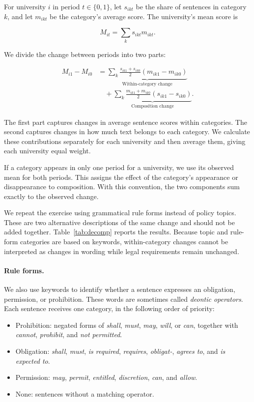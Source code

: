 \documentclass[11pt]{article}
\begin{document}
For university $i$ in period $t\in\{0,1\}$, let $s_{ikt}$ be the share of sentences in category $k$, and let $m_{ikt}$ be the category's average score. The university's mean score is

\begin{equation}
M_{it}=\sum_k s_{ikt}m_{ikt}.
\end{equation}

We divide the change between periods into two parts:

\begin{equation}
\begin{split}
M_{i1}-M_{i0}
&=\underbrace{\sum_k\frac{s_{ik1}+s_{ik0}}{2}(m_{ik1}-m_{ik0})}_{\text{Within-category change}}\\
&\quad+\underbrace{\sum_k\frac{m_{ik1}+m_{ik0}}{2}(s_{ik1}-s_{ik0})}_{\text{Composition change}}.
\end{split}
\end{equation}

The first part captures changes in average sentence scores within categories. The second captures changes in how much text belongs to each category. We calculate these contributions separately for each university and then average them, giving each university equal weight.

If a category appears in only one period for a university, we use its observed mean for both periods. This assigns the effect of the category's appearance or disappearance to composition. With this convention, the two components sum exactly to the observed change.

We repeat the exercise using grammatical rule forms instead of policy topics. These are two alternative descriptions of the same change and should not be added together. Table~\ref{tab:decomp} reports the results. Because topic and rule-form categories are based on keywords, within-category changes cannot be interpreted as changes in wording while legal requirements remain unchanged.



\paragraph{Rule forms.}
We also use keywords to identify whether a sentence expresses an obligation, permission, or prohibition. These words are sometimes called \emph{deontic operators}. Each sentence receives one category, in the following order of priority:

\begin{itemize}
\item Prohibition: negated forms of \emph{shall}, \emph{must}, \emph{may}, \emph{will}, or \emph{can}, together with \emph{cannot}, \emph{prohibit}, and \emph{not permitted}.
\item Obligation: \emph{shall}, \emph{must}, \emph{is required}, \emph{requires}, \emph{obligat-}, \emph{agrees to}, and \emph{is expected to}.
\item Permission: \emph{may}, \emph{permit}, \emph{entitled}, \emph{discretion}, \emph{can}, and \emph{allow}.
\item None: sentences without a matching operator.
\end{itemize}
\end{document}
